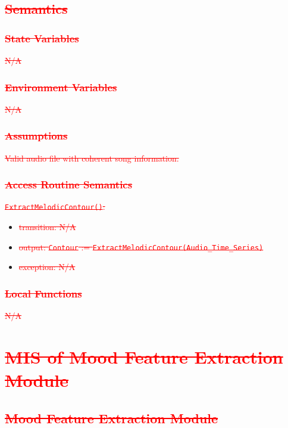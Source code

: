 \documentclass[12pt, titlepage]{article}
\begin{document}
\subsection{\textcolor{red}{\sout{Semantics}}}

\subsubsection{\textcolor{red}{\sout{State Variables}}}
\textcolor{red}{\sout{N/A}}

\subsubsection{\textcolor{red}{\sout{Environment Variables}}}
\textcolor{red}{\sout{N/A}}

\subsubsection{\textcolor{red}{\sout{Assumptions}}}
\textcolor{red}{\sout{Valid audio file with coherent song information.}}

\subsubsection{\textcolor{red}{\sout{Access Routine Semantics}}}

\noindent \textcolor{red}{\sout{\texttt{ExtractMelodicContour()}:}}
\begin{itemize}
\item \textcolor{red}{\sout{transition: N/A}}
\item \textcolor{red}{\sout{output: \texttt{Contour} := \texttt{ExtractMelodicContour(Audio\_Time\_Series)}}}
\item \textcolor{red}{\sout{exception: N/A}}
\end{itemize}

\subsubsection{\textcolor{red}{\sout{Local Functions}}}
\textcolor{red}{\sout{N/A}}

\section{\textcolor{red}{\sout{MIS of Mood Feature Extraction Module}}} 

\subsection{\textcolor{red}{\sout{Mood Feature Extraction Module}}}
\end{document}
